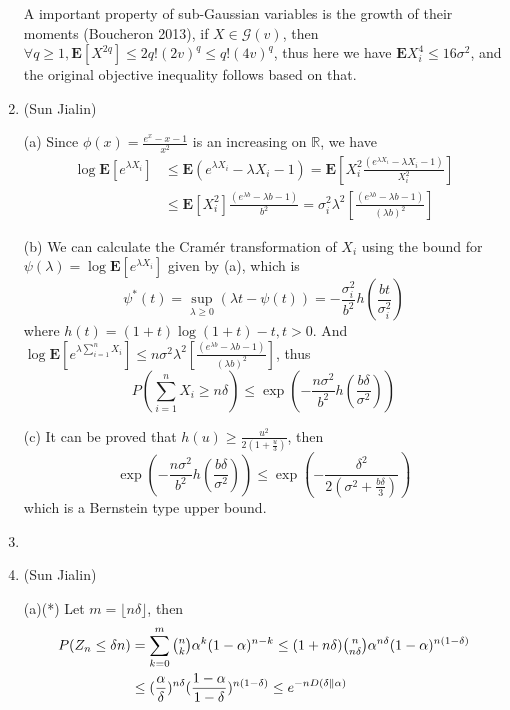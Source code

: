 \begin{enumerate}
	A important property of sub-Gaussian variables is the growth of their moments (Boucheron 2013), if $ X \in \mathcal{G}(v) $, then $ \forall q \geq 1, \bm{E}[X^{2q}] \leq 2q!(2v)^{q} \leq q!(4v)^{q} $, thus here we have $ \bm{E}X^{4}_{i} \leq 16\sigma^{2} $, and the original objective inequality follows based on that.
	
	\item
	(Sun Jialin)
	
	(a) Since $ \phi(x)=\frac{e^{x}-x-1}{x^{2}} $ is an increasing on $ \mathbb{R} $, we have \[\begin{split} \log \bm{E}[e^{\lambda X_{i}}] &\leq \bm{E}(e^{\lambda X_{i}}-\lambda X_{i}-1)=\bm{E}[X_{i}^{2} \frac{(e^{\lambda X_{i}}-\lambda X_{i}-1)}{X_{i}^{2}}] \\& \leq \bm{E}[X_{i}^{2}] \frac{(e^{\lambda b}-\lambda b-1)}{b^{2}} = 
	\sigma_{i}^{2}\lambda^{2}[\frac{(e^{\lambda b}-\lambda b-1)}{(\lambda b)^{2}}] \end{split}\]
	
	(b) We can calculate the Cram\'er transformation of $ X_{i} $ using the bound for $ \psi(\lambda)=\log \bm{E}[e^{\lambda X_{i}}] $ given by (a), which is \[ \psi^{*}(t) = \sup \limits_{\lambda \geq 0}(\lambda t - \psi(t))=-\frac{\sigma^{2}_{i}}{b^{2}}h(\frac{bt}{\sigma_{i}^{2}}) \]
	where $ h(t)=(1+t)\log(1+t)-t, t>0$. And $ \log \bm{E}[e^{\lambda \sum_{i=1}^{n} X_{i}}] \leq n\sigma^{2}\lambda^{2}[\frac{(e^{\lambda b}-\lambda b-1)}{(\lambda b)^{2}}] $, thus
	\[ P(\sum_{i=1}^{n} X_{i} \geq n\delta) \leq \exp(-\frac{n\sigma^{2}}{b^{2}}h(\frac{b\delta}{\sigma^{2}})) \]
	
	(c) It can be proved that $ h(u) \geq \frac{u^{2}}{2(1+\frac{u}{3})} $, then \[ \exp(-\frac{n\sigma^{2}}{b^{2}}h(\frac{b\delta}{\sigma^{2}})) \leq \exp(-\frac{\delta^{2}}{2(\sigma^{2}+\frac{b\delta}{3})}) \]
	which is a Bernstein type upper bound.
	
	\item
	
	\item
	(Sun Jialin)
	
	(a)(*) Let $ m=\lfloor n\delta \rfloor $, then \[\begin{split} P(Z_{n} \leq \delta n)&=\sum_{k=0}^{m} \tbinom{n}{k}\alpha^{k}(1-\alpha)^{n-k} \leq (1+n\delta)\tbinom{n}{n\delta}\alpha^{n\delta}(1-\alpha)^{n(1-\delta)}
	\\& \leq (\frac{\alpha}{\delta})^{n\delta}(\frac{1-\alpha}{1-\delta})^{n(1-\delta)}
	\leq e^{-nD(\delta \parallel \alpha)} \end{split}\]
	

\end{enumerate}
